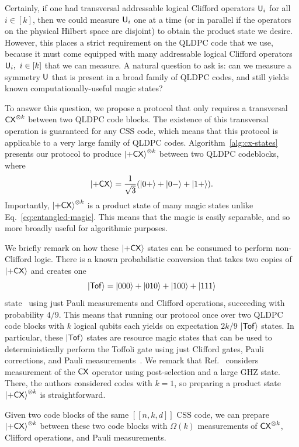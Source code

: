 \documentclass[11pt]{article}
\begin{document}
Certainly, if one had transversal addressable logical Clifford operators $\mathsf{U}_i$ for all $i\in [k]$, then we could measure $\mathsf{U}_i$ one at a time (or in parallel if the operators on the physical Hilbert space are disjoint) to obtain the product state we desire.
However, this places a strict requirement on the QLDPC code that we use, because it must come equipped with many addressable logical Clifford operators $\mathsf{U}_i,\ i\in[k]$ that we can measure.
A natural question to ask is: can we measure a symmetry $\mathsf{U}$ that is present in a broad family of QLDPC codes, and still yields known computationally-useful magic states?


To answer this question, we propose a protocol that only requires a transversal $\mathsf{CX}^{\otimes k}$ between two QLDPC code blocks.
The existence of this transversal operation is guaranteed for any CSS code, which means that this protocol is applicable to a very large family of QLDPC codes.
Algorithm~\ref{alg:cx-states} presents our protocol to produce $\ket{+\mathsf{CX}}^{\otimes k}$ between two QLDPC codeblocks, where $$\ket{+\mathsf{CX}}=\frac{1}{\sqrt{3}}(\ket{0+}+\ket{0-}+\ket{1+}).$$
Importantly, $\ket{+\mathsf{CX}}^{\otimes k}$ is a product state of many magic states unlike Eq.~\eqref{eq:entangled-magic}.
This means that the magic is easily separable, and so more broadly useful for algorithmic purposes. 

We briefly remark on how these $\ket{+\mathsf{CX}}$ states can be consumed to perform non-Clifford logic. 
There is a known probabilistic conversion that takes two copies of $\ket{+\mathsf{CX}}$  and creates one $$\ket{\mathsf{Tof}}=\ket{000}+\ket{010}+\ket{100}+\ket{111}$$ state~\cite{dennis2001toward,gupta2024encoding} using just Pauli measurements and Clifford operations, succeeding with probability $4/9$.
This means that running our protocol once over two QLDPC code blocks with $k$ logical qubits each yields on expectation $2k/9$ $\ket{\mathsf{Tof}}$ states.
In particular, these $\ket{\mathsf{Tof}}$ states are resource magic states that can be used to deterministically perform the Toffoli gate using just Clifford gates, Pauli corrections, and Pauli measurements~\cite{dennis2001toward}.
We remark that Ref.~\cite{vaknin2026efficientmagicstatecultivation} considers measurement of the $\mathsf{CX}$ operator using post-selection and a large GHZ state. 
There, the authors considered codes with $k=1$, so preparing a product state $\ket{+\mathsf{CX}}^{\otimes k}$ is straightforward. 

\begin{example}
    Given two code blocks of the same $[[n,k,d]]$ CSS code, we can prepare $\ket{+\mathsf{CX}}^{\otimes k}$ between these two code blocks with $\Omega(k)$ measurements of $\mathsf{CX}^{\otimes k}$, Clifford operations, and Pauli measurements.
\end{example}
\end{document}
